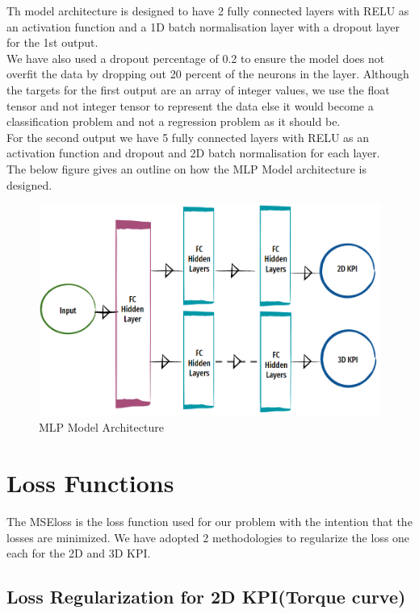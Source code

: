 \documentclass{report} %
\begin{document}
Th model architecture is designed to have 2 fully connected layers with RELU as an activation function and a 1D batch normalisation layer with a dropout layer for the 1st output.\\
We have also used a dropout percentage of 0.2 to ensure the model does not overfit the data by dropping out 20 percent of the neurons in the layer.
Although the targets for the first output are an array of integer values, we use the float tensor and not integer tensor to represent the data else it would become a classification problem and not a regression problem as it should be. \\
For the second output we have 5 fully connected layers with RELU as an activation function and dropout and \ac{2D} batch normalisation for each layer.\\

The below figure gives an outline on how the MLP Model architecture is designed.

\begin{figure}[H]
    \centering
    \includegraphics[width=1\textwidth]{./ReportImages/mlp_architecture.png} 
    \caption{MLP Model Architecture}
    \label{fig:MLP Model Architecture}
\end{figure}

\section{Loss Functions}\label{sec:Loss Functions}
The \ac{MSE}loss is the loss function used for our problem with the intention that the losses are minimized. We have adopted 2 methodologies to regularize the loss one each for the \ac{2D} and \ac{3D} \ac{KPI}.

\subsection{Loss Regularization for \ac{2D} \ac{KPI}(Torque curve)}\label{sec:Loss Regularization for 2D KPI}
\end{document}
